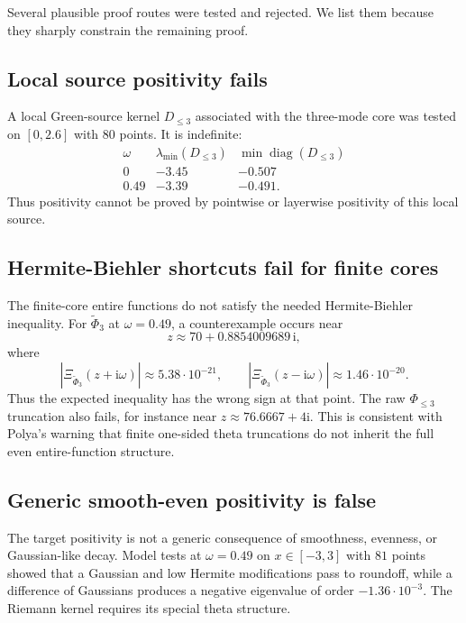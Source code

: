 \documentclass[11pt]{article}
\newcommand{\ii}{\mathrm i}
\begin{document}
Several plausible proof routes were tested and rejected.  We list them because
they sharply constrain the remaining proof.

\subsection{Local source positivity fails}

A local Green-source kernel $D_{\le 3}$ associated with the three-mode core was
tested on $[0,2.6]$ with $80$ points.  It is indefinite:
\[
\begin{array}{c|cc}
\omega & \lambda_{\min}(D_{\le 3}) & \min \operatorname{diag}(D_{\le 3})\\
\hline
0      & -3.45 & -0.507\\
0.49   & -3.39 & -0.491.
\end{array}
\]
Thus positivity cannot be proved by pointwise or layerwise positivity of this
local source.

\subsection{Hermite-Biehler shortcuts fail for finite cores}

The finite-core entire functions do not satisfy the needed
Hermite-Biehler inequality.  For $\widetilde\Phi_3$ at $\omega=0.49$, a
counterexample occurs near
\[
  z\approx 70+0.8854009689\,\ii,
\]
where
\[
  |\Xi_{\widetilde\Phi_3}(z+\ii\omega)|
   \approx 5.38\cdot 10^{-21},
  \qquad
  |\Xi_{\widetilde\Phi_3}(z-\ii\omega)|
   \approx 1.46\cdot 10^{-20}.
\]
Thus the expected inequality has the wrong sign at that point.  The raw
$\Phi_{\le 3}$ truncation also fails, for instance near
$z\approx 76.6667+4\ii$.  This is consistent with Polya's warning that finite
one-sided theta truncations do not inherit the full even entire-function
structure.

\subsection{Generic smooth-even positivity is false}

The target positivity is not a generic consequence of smoothness, evenness,
or Gaussian-like decay.  Model tests at $\omega=0.49$ on $x\in[-3,3]$ with
$81$ points showed that a Gaussian and low Hermite modifications pass to
roundoff, while a difference of Gaussians produces a negative eigenvalue of
order $-1.36\cdot 10^{-3}$.  The Riemann kernel requires its special theta
structure.
\end{document}
